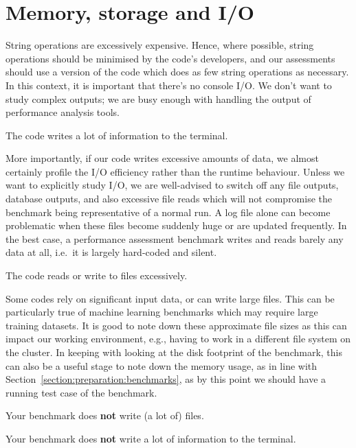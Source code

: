 \section{Memory, storage and I/O}
\label{section:preparation:io}

String operations are excessively expensive.
Hence, where possible, string operations should be minimised by the code's developers, and our assessments should use a version of the code which does as few string operations as necessary.
In this context, it is important that there's no console I/O.
We don't want to study complex outputs; we are busy enough with handling the output of performance analysis tools.

\begin{assessmentcrime}
 The code writes a lot of information to the terminal. 
\end{assessmentcrime}

More importantly, if our code writes excessive amounts of data, we almost certainly profile the I/O efficiency rather than the runtime behaviour.
Unless we want to explicitly study I/O, we are well-advised to switch off any file outputs, database outputs, and also excessive file reads which will not compromise the benchmark being representative of a normal run.
A log file alone can become problematic when these files become suddenly huge or are updated frequently.
In the best case, a performance assessment benchmark writes and reads barely any data at all, i.e.~it is largely hard-coded and silent.

\begin{assessmentcrime}
 The code reads or write to files excessively. 
\end{assessmentcrime}

Some codes rely on significant input data, or can write large files. This can be particularly true of machine learning benchmarks which may require large training datasets. It is good to note down these approximate file sizes as this can impact our working environment, e.g., having to work in a different file system on the cluster. In keeping with looking at the disk footprint of the benchmark, this can also be a useful stage to note down the memory usage, as in line with Section~\ref{section:preparation:benchmarks}, as by this point we should have a running test case of the benchmark.

\begin{checklist}
 \item Your benchmark does {\bf not} write (a lot of) files.
 \item Your benchmark does {\bf not} write a lot of information to the terminal.
\end{checklist}

